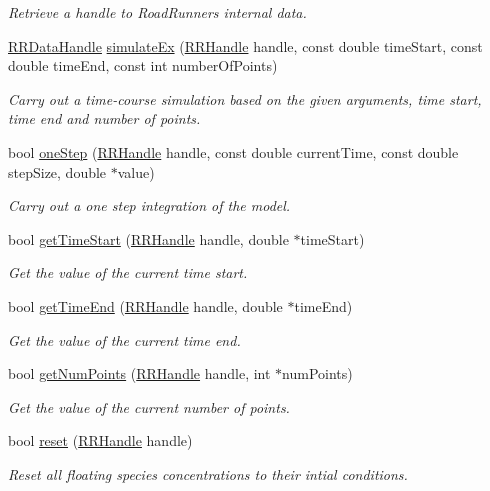 \begin{DoxyCompactItemize}
\begin{DoxyCompactList}\small\item\em Retrieve a handle to Road\-Runners internal data. \end{DoxyCompactList}\item 
\hyperlink{rrc__types_8h_ad0beb6fbdd576789fab9cead01d8b9e9}{R\-R\-Data\-Handle} \hyperlink{group__simulation_gac3646c86d4a058ec4d43b1a66bf127cc}{simulate\-Ex} (\hyperlink{rrc__types_8h_a1d68f0592372208fa5a5f2799ea4b3ae}{R\-R\-Handle} handle, const double time\-Start, const double time\-End, const int number\-Of\-Points)
\begin{DoxyCompactList}\small\item\em Carry out a time-\/course simulation based on the given arguments, time start, time end and number of points. \end{DoxyCompactList}\item 
bool \hyperlink{group__simulation_ga64cec7cbfbac4e4a11dcda4cc6eb2b9e}{one\-Step} (\hyperlink{rrc__types_8h_a1d68f0592372208fa5a5f2799ea4b3ae}{R\-R\-Handle} handle, const double current\-Time, const double step\-Size, double $\ast$value)
\begin{DoxyCompactList}\small\item\em Carry out a one step integration of the model. \end{DoxyCompactList}\item 
bool \hyperlink{group__simulation_gaf302d02e9f0d57dd05995a7a211e5236}{get\-Time\-Start} (\hyperlink{rrc__types_8h_a1d68f0592372208fa5a5f2799ea4b3ae}{R\-R\-Handle} handle, double $\ast$time\-Start)
\begin{DoxyCompactList}\small\item\em Get the value of the current time start. \end{DoxyCompactList}\item 
bool \hyperlink{group__simulation_ga1130df59dce620b619e3e58874025e57}{get\-Time\-End} (\hyperlink{rrc__types_8h_a1d68f0592372208fa5a5f2799ea4b3ae}{R\-R\-Handle} handle, double $\ast$time\-End)
\begin{DoxyCompactList}\small\item\em Get the value of the current time end. \end{DoxyCompactList}\item 
bool \hyperlink{group__simulation_ga3e14da4bd986a908e4f6bcfc42c20717}{get\-Num\-Points} (\hyperlink{rrc__types_8h_a1d68f0592372208fa5a5f2799ea4b3ae}{R\-R\-Handle} handle, int $\ast$num\-Points)
\begin{DoxyCompactList}\small\item\em Get the value of the current number of points. \end{DoxyCompactList}\item 
bool \hyperlink{group__simulation_gaeaf9374c9a0cad0898f5e0a37bc387c5}{reset} (\hyperlink{rrc__types_8h_a1d68f0592372208fa5a5f2799ea4b3ae}{R\-R\-Handle} handle)
\begin{DoxyCompactList}\small\item\em Reset all floating species concentrations to their intial conditions. \end{DoxyCompactList}\end{DoxyCompactItemize}


